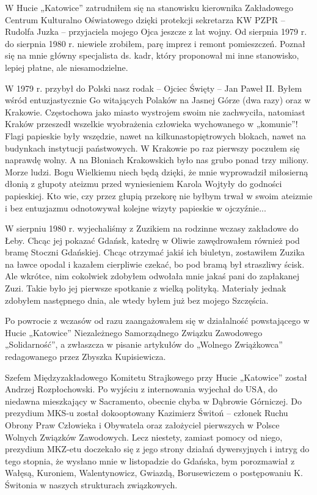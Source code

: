W Hucie „Katowice” zatrudniłem się na stanowisku kierownika Zakładowego Centrum Kulturalno Oświatowego dzięki protekcji sekretarza KW PZPR – Rudolfa Juzka – przyjaciela mojego Ojca jeszcze z lat wojny. Od sierpnia 1979 r. do sierpnia 1980 r. niewiele zrobiłem, parę imprez i remont pomieszczeń. Poznał się na mnie główny specjalista ds. kadr, który proponował mi inne stanowisko, lepiej płatne, ale niesamodzielne.

W 1979 r. przybył do Polski nasz rodak – Ojciec Święty – Jan Paweł II. Byłem wśród entuzjastycznie Go witających Polaków na Jasnej Górze (dwa razy) oraz w Krakowie. Częstochowa jako miasto wystrojem swoim nie zachwyciła, natomiast Kraków przeszedł wszelkie wyobrażenia człowieka wychowanego w „komunie”! Flagi papieskie były wszędzie, nawet na kilkunastopiętrowych blokach, nawet na budynkach instytucji państwowych. W Krakowie po raz pierwszy poczułem się naprawdę wolny. A na Błoniach Krakowskich było nas grubo ponad trzy miliony. Morze ludzi. Bogu Wielkiemu niech będą dzięki, że mnie wyprowadził miłosierną dłonią z głupoty ateizmu przed wyniesieniem Karola Wojtyły do godności papieskiej. Kto wie, czy przez głupią przekorę nie byłbym trwał w swoim ateizmie i bez entuzjazmu odnotowywał kolejne wizyty papieskie w ojczyźnie...

W sierpniu 1980 r. wyjechaliśmy z Zuzikiem na rodzinne wczasy zakładowe do Łeby. Chcąc jej pokazać Gdańsk, katedrę w Oliwie zawędrowałem również pod bramę Stoczni Gdańskiej. Chcąc otrzymać jakiś ich biuletyn, zostawiłem Zuzika na ławce opodal i kazałem cierpliwie czekać, bo pod bramą był straszliwy ścisk. Ale wkrótce, nim cokolwiek zdobyłem odwołała mnie jakaś pani do zapłakanej Zuzi. Takie było jej pierwsze spotkanie z wielką polityką. Materiały jednak zdobyłem następnego dnia, ale wtedy byłem już bez mojego Szczęścia.

Po powrocie z wczasów od razu zaangażowałem się w działalność powstającego w Hucie „Katowice” Niezależnego Samorządnego Związku Zawodowego „Solidarność”, a zwłaszcza w pisanie artykułów do „Wolnego Zwiążkowca” redagowanego przez Zbyszka Kupisiewicza.

Szefem Międzyzakładowego Komitetu Strajkowego przy Hucie „Katowice” został Andrzej Rozpłochowski. Po wyjściu z internowania wyjechał do USA,  do niedawna mieszkający w Sacramento, obecnie chyba w Dąbrowie Górniczej. Do prezydium MKS-u został dokooptowany Kazimierz Świtoń – członek Ruchu Obrony Praw Człowieka i Obywatela oraz założyciel pierwszych w Polsce Wolnych Związków Zawodowych. Lecz niestety, zamiast pomocy od niego, prezydium MKZ-etu doczekało się z jego strony działań dywersyjnych i intryg do tego stopnia, że wysłano mnie w listopadzie do Gdańska, bym porozmawiał z Wałęsą, Kuroniem, Walentynowicz, Gwiazdą, Borusewiczem o postępowaniu K. Świtonia w naszych strukturach związkowych. 

